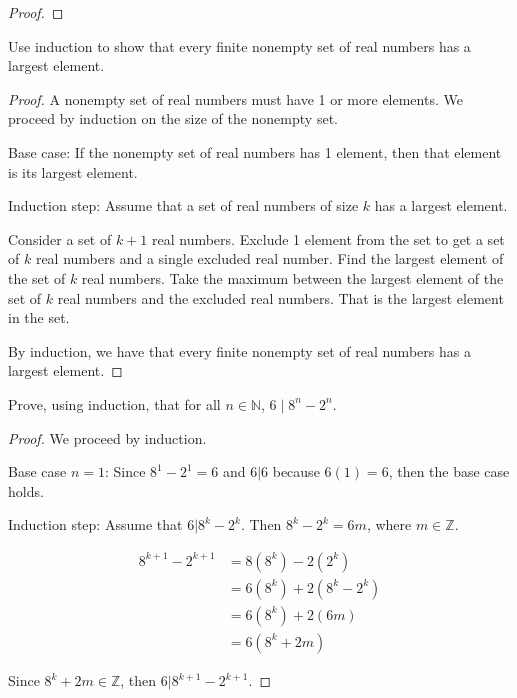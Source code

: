 \documentclass[12 pt]{exam}
\begin{document}
\begin{questions}
\begin{solution}
\begin{proof}
\end{proof}\end{solution}



\question Use induction to show that every finite nonempty set of real numbers has a largest element. 

\begin{solution}\begin{proof}
A nonempty set of real numbers must have 1 or more elements. We proceed by induction on the size
of the nonempty set.

Base case: If the nonempty set of real numbers has 1 element, then that element is its largest element.

Induction step: Assume that a set of real numbers of size $k$ has a largest element.

Consider a set of $k+1$ real numbers. Exclude 1 element from the set to get a set of $k$ real numbers
and a single excluded real number. Find the largest element of the set of $k$ real numbers. Take the
maximum between the largest element of the set of $k$ real numbers and the excluded real numbers.
That is the largest element in the set.

By induction, we have that every finite nonempty set of real numbers has a largest element.
\end{proof}\end{solution}


\question Prove, using induction, that for all $n \in \mathbb{N}$, $6 \mid 8^n - 2^n$.

\begin{solution}\begin{proof}
We proceed by induction.

Base case $n=1$: Since $8^1 - 2^1 = 6$ and $6 | 6$ because $6(1) = 6$, then the base case holds.

Induction step: Assume that $6 | 8^k - 2^k$. Then $8^k - 2^k = 6m$, where $m \in \mathbb{Z}$.

\begin{align*}
    8^{k+1} - 2^{k+1} &= 8 (8^k) - 2 (2^k) \\
                      &= 6 (8^k) + 2(8^k - 2^k) \\
                      &= 6 (8^k) + 2(6m) \\
                      &= 6(8^k + 2m)
\end{align*}

Since $8^k + 2m \in \mathbb{Z}$, then $6 | 8^{k+1} - 2^{k+1}$.


\end{proof}
\end{solution}
\end{questions}
\end{document}

